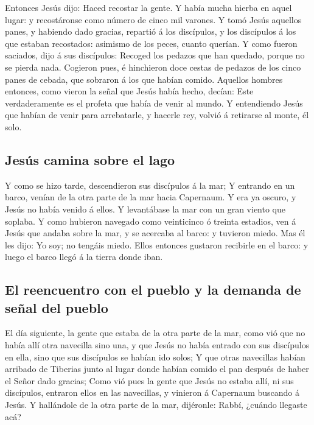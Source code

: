  Entonces Jesús dijo: Haced recostar la gente. Y había
mucha hierba en aquel lugar: y recostáronse como número de cinco mil
varones.  Y tomó Jesús aquellos panes, y habiendo dado
gracias, repartió á los discípulos, y los discípulos á los que estaban
recostados: asimismo de los peces, cuanto querían.  Y como
fueron saciados, dijo á sus discípulos: Recoged los pedazos que han
quedado, porque no se pierda nada.  Cogieron pues, é
hinchieron doce cestas de pedazos de los cinco panes de cebada, que
sobraron á los que habían comido.  Aquellos hombres
entonces, como vieron la señal que Jesús había hecho, decían: Este
verdaderamente es el profeta que había de venir al mundo. 
Y entendiendo Jesús que habían de venir para arrebatarle, y hacerle rey,
volvió á retirarse al monte, él solo.

\hypertarget{jesuxfas-camina-sobre-el-lago}{%
\subsection{Jesús camina sobre el
lago}\label{jesuxfas-camina-sobre-el-lago}}

 Y como se hizo tarde, descendieron sus discípulos á la
mar;  Y entrando en un barco, venían de la otra parte de la
mar hacia Capernaum. Y era ya oscuro, y Jesús no había venido á ellos.
 Y levantábase la mar con un gran viento que soplaba.
 Y como hubieron navegado como veinticinco ó treinta
estadios, ven á Jesús que andaba sobre la mar, y se acercaba al barco: y
tuvieron miedo.  Mas él les dijo: Yo soy; no tengáis miedo.
 Ellos entonces gustaron recibirle en el barco: y luego el
barco llegó á la tierra donde iban.

\hypertarget{el-reencuentro-con-el-pueblo-y-la-demanda-de-seuxf1al-del-pueblo}{%
\subsection{El reencuentro con el pueblo y la demanda de señal del
pueblo}\label{el-reencuentro-con-el-pueblo-y-la-demanda-de-seuxf1al-del-pueblo}}

 El día siguiente, la gente que estaba de la otra parte de
la mar, como vió que no había allí otra navecilla sino una, y que Jesús
no había entrado con sus discípulos en ella, sino que sus discípulos se
habían ido solos;  Y que otras navecillas habían arribado
de Tiberias junto al lugar donde habían comido el pan después de haber
el Señor dado gracias;  Como vió pues la gente que Jesús no
estaba allí, ni sus discípulos, entraron ellos en las navecillas, y
vinieron á Capernaum buscando á Jesús.  Y hallándole de la
otra parte de la mar, dijéronle: Rabbí, ¿cuándo llegaste acá?

